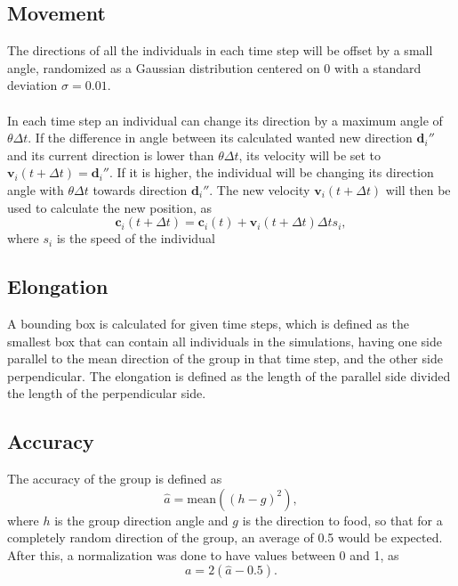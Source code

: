 \subsection{Movement} %
\label{sub:movement}
The directions of all the individuals in each time step will be offset by a small angle, randomized as a Gaussian distribution centered on 0 with a standard deviation $\sigma = 0.01$.
\\\\
In each time step an individual can change its direction by a maximum angle of $\theta \Delta t$. 
If the difference in angle between its calculated wanted new direction $\boldsymbol{d}_i''$ and its current direction is lower than $\theta \Delta t$, its velocity will be set to $\boldsymbol{v}_i(t + \Delta t) = \boldsymbol{d}_i''$.
If it is higher, the individual will be changing its direction angle with $\theta \Delta t$ towards direction $\boldsymbol{d}_i''$. 
The new velocity $\boldsymbol{v}_i(t + \Delta t)$ will then be used to calculate the new position, as 
\begin{equation}
	\boldsymbol{c}_i(t+\Delta t) = \boldsymbol{c}_i(t) + \boldsymbol{v}_i(t + \Delta t)\Delta t s_i,
\end{equation}
where $s_i$ is the speed of the individual

\subsection{Elongation} %
\label{sub:elongation}
A bounding box is calculated for given time steps, which is defined as the smallest box that can contain all individuals in the simulations, having one side parallel to the mean direction of the group in that time step, and the other side perpendicular.
The elongation is defined as the length of the parallel side divided the length of the perpendicular side.

\subsection{Accuracy} %
\label{sub:accuracy}
The accuracy of the group is defined as 
\begin{equation}
	\hat{a} = \text{mean} ((h - g)^2),
\end{equation}
where $h$ is the group direction angle and $g$ is the direction to food, so that for a completely random direction of the group, an average of 0.5 would be expected. After this, a normalization was done to have values between 0 and 1, as
\begin{equation}
	a = 2(\hat{a} - 0.5).
\end{equation}

